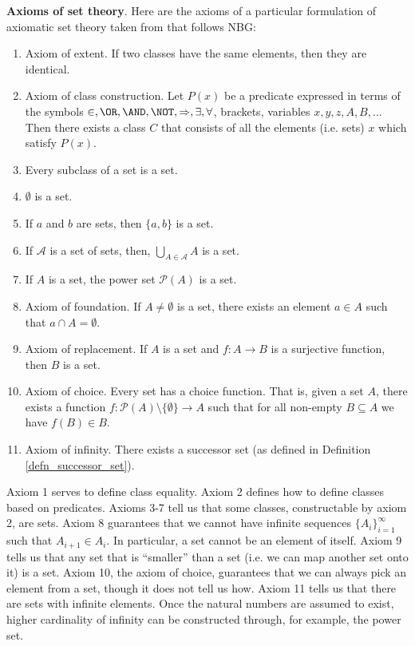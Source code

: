 \documentclass{bareminimum}
\begin{document}
\textbf{Axioms of set theory}. Here  are the axioms of a particular formulation of axiomatic set theory taken from \cite{pinter2014book} that follows NBG:
\begin{enumerate}
	\item Axiom of extent. If two classes have the same elements, then they are identical.
	\item Axiom of class construction. Let $P(x)$ be a predicate expressed in terms of the symbols $\in, \OR, \AND, \NOT, \Rightarrow, \exists, \forall$, brackets, variables $x, y, z, A, B, ...$ Then there exists a class $C$ that consists of all the elements (i.e. sets) $x$ which satisfy $P(x)$.
	\item Every subclass of a set is a set.
	\item $\emptyset$ is a set.
	\item If $a$ and $b$ are sets, then $\{a, b\}$ is a set.
	\item If $\mathcal{A}$ is a set of sets, then, $\bigcup\limits_{A \in \mathcal{A}} A$ is a set.
	\item If $A$ is a set, the power set $\mathcal{P}(A)$ is a set.
	\item Axiom of foundation. If $A \neq \emptyset$ is a set, there exists an element $a \in A$ such that $a \cap A = \emptyset$.
	\item Axiom of replacement. If $A$ is a set and $f : A \to B$ is a surjective function, then $B$ is a set.
	\item Axiom of choice. Every set has a choice function. That is, given a set $A$, there exists a function $f : \mathcal{P}(A) \setminus \{ \emptyset \} \to A$ such that for all non-empty $B \subseteq A$ we have $f(B) \in B$.
	\item Axiom of infinity. There exists a successor set (as defined in Definition \ref{defn_successor_set}).
\end{enumerate}


\begin{remark}
	Axiom 1 serves to define class equality. Axiom 2 defines how to define classes based on predicates. Axioms 3-7 tell us that some classes, constructable by axiom 2, are sets. Axiom 8 guarantees that we cannot have infinite sequences $\{ A_i \}_{i=1}^\infty$ such that $A_{i+1} \in A_i$. In particular, a set cannot be an element of itself. Axiom 9 tells us that any set that is ``smaller'' than a set (i.e. we can map another set onto it) is a set. Axiom 10, the axiom of choice, guarantees that we can always pick an element from a set, though it does not tell us how. Axiom 11 tells us that there are sets with infinite elements. Once the natural numbers are assumed to exist, higher cardinality of infinity can be constructed through, for example, the power set.
\end{remark}
\end{document}
